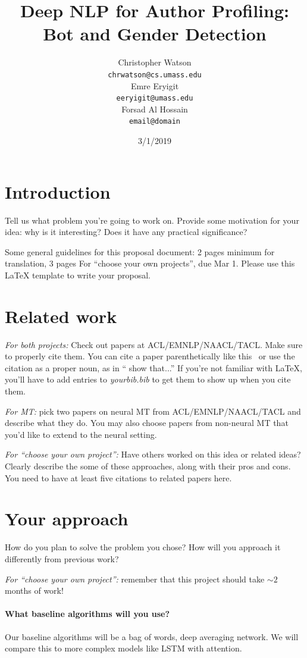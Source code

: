 \documentclass[11pt,a4paper]{article}
\title{Deep NLP for Author Profiling: Bot and Gender Detection}
\author{Christopher Watson \\
  {\tt chrwatson@cs.umass.edu} \\\And
  Emre Eryigit \\
  {\tt eeryigit@umass.edu} \\\And
  Forsad Al Hossain\\
  {\tt email@domain} \\}
\date{3/1/2019}
\begin{document}
\maketitle

\section{Introduction}
Tell us what problem you're going to work on. Provide some motivation for your idea: why is it interesting? Does it have any practical significance? 

Some general guidelines for this proposal document: 2 pages minimum for translation, 3 pages For ``choose your own projects'', due Mar 1. Please use this LaTeX template to write your proposal.

\section{Related work}

\noindent\textit{For both projects:} 
Check out papers at ACL/EMNLP/NAACL/TACL. Make sure to properly cite them. You can cite a paper parenthetically like this~\cite{andrew2007scalable} or use the citation as a proper noun, as in `` show that...'' If you're not familiar with LaTeX, you'll have to add entries to \emph{yourbib.bib} to get them to show up when you cite them. 

\noindent\textit{For MT:} pick two papers on neural MT from ACL/EMNLP/NAACL/TACL and describe what they do. You may also choose papers from non-neural MT that you'd like to  extend to the neural setting.

\noindent\textit{For ``choose your own project'':}
Have others worked on this idea or related ideas? Clearly describe the some of these approaches, along with their pros and cons. You need to have at least five citations to related papers here. 

\section{Your approach}
How do you plan to solve the problem you chose? How will you approach it differently from previous work?

\noindent\textit{For ``choose your own project'':} remember that this project should take $\sim 2$ months of work! 

\paragraph{What baseline algorithms will you use?}
Our baseline algorithms will be a bag of words, deep averaging network. We will compare this to more complex models like LSTM with attention.
\end{document}
